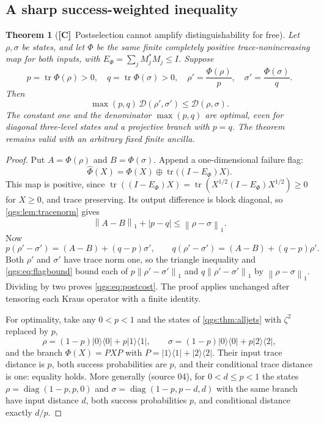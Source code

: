 \documentclass[11pt,oneside]{article}
\numberwithin{equation}{section}
\theoremstyle{plain}
\newtheorem{theorem}{Theorem}[section]
\theoremstyle{definition}
\theoremstyle{remark}
\newcommand{\TD}{\mathcal D}
\DeclareMathOperator{\tr}{tr}
\DeclareMathOperator{\diag}{diag}
\newcommand{\norm}[1]{\left\|#1\right\|}
\newcommand{\ket}[1]{\lvert#1\rangle}
\newcommand{\bra}[1]{\langle#1\rvert}
\newcommand{\proj}[1]{\ket{#1}\!\bra{#1}}
\newcommand{\TC}{\textcolor{TierC}{\textsf{\bfseries[C]}}}
\begin{document}
\subsection{A sharp success-weighted inequality}
\begin{theorem}[\TC\ Postselection cannot amplify distinguishability for free]\label{qgs:thm:cost}
Let $\rho,\sigma$ be states, and let $\Phi$ be the \emph{same} finite completely positive trace-nonincreasing map for both inputs, with $E_\Phi=\sum_jM_j^*M_j\le I$. Suppose
\[
 p=\tr\Phi(\rho)>0,\quad q=\tr\Phi(\sigma)>0,
 \quad \rho'=\frac{\Phi(\rho)}p,\quad \sigma'=\frac{\Phi(\sigma)}q.
\]
Then
\begin{equation}\label{qgs:eq:postcost}
 \boxed{\ \max(p,q)\,\TD(\rho',\sigma')\le \TD(\rho,\sigma).\ }
\end{equation}
The constant one and the denominator $\max(p,q)$ are optimal, even for diagonal three-level states and a projective branch with $p=q$. The theorem remains valid with an arbitrary fixed finite ancilla.
\end{theorem}
\begin{proof}
Put $A=\Phi(\rho)$ and $B=\Phi(\sigma)$. Append a one-dimensional failure flag:
\[
 \widehat\Phi(X)=\Phi(X)\oplus\tr\bigl((I-E_\Phi)X\bigr).
\]
This map is positive, since $\tr((I-E_\Phi)X)=\tr(X^{1/2}(I-E_\Phi)X^{1/2})\ge0$ for $X\ge0$, and trace preserving. Its output difference is block diagonal, so \cref{qgs:lem:tracenorm} gives
\begin{equation}\label{qgs:eq:flagbound}
 \norm{A-B}_1+|p-q|\le\norm{\rho-\sigma}_1.
\end{equation}
Now
\[
 p(\rho'-\sigma')=(A-B)+(q-p)\sigma',\qquad
 q(\rho'-\sigma')=(A-B)+(q-p)\rho'.
\]
Both $\rho'$ and $\sigma'$ have trace norm one, so the triangle inequality and \eqref{qgs:eq:flagbound} bound each of $p\norm{\rho'-\sigma'}_1$ and $q\norm{\rho'-\sigma'}_1$ by $\norm{\rho-\sigma}_1$. Dividing by two proves \eqref{qgs:eq:postcost}. The proof applies unchanged after tensoring each Kraus operator with a finite identity.

For optimality, take any $0<p<1$ and the states of \cref{qgs:thm:alljets} with $\zeta^2$ replaced by $p$,
\[
 \rho=(1-p)\proj0+p\proj1,\qquad \sigma=(1-p)\proj0+p\proj2,
\]
and the branch $\Phi(X)=PXP$ with $P=\proj1+\proj2$. Their input trace distance is $p$, both success probabilities are $p$, and their conditional trace distance is one: equality holds. More generally (source 04), for $0<d\le p<1$ the states $\rho=\diag(1-p,p,0)$ and $\sigma=\diag(1-p,p-d,d)$ with the same branch have input distance $d$, both success probabilities $p$, and conditional distance exactly $d/p$.
\end{proof}
\end{document}
